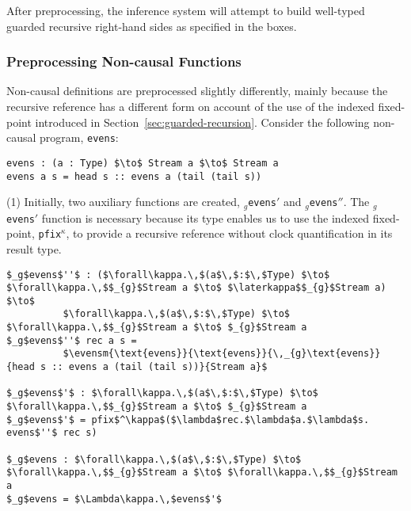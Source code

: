 After preprocessing, the inference system will attempt to build well-typed
guarded recursive right-hand sides as specified in the boxes.

\newcommand{\evens}[5]{\ensuremath{\boxed{#1;\noncausal;\phi,(#2,#3);\open;\Gamma\,\vdash\,\text{#4}\,:\,\text{#5}\,\infer
        \text{?}\,:\,\forall\kappa\,_{g}\text{#5})}}}
\newcommand{\evensm}[5]{\ensuremath{\boxed{
            \begin{matrix*}[l] #1;\causal;\phi,(#2,#3);\open;\Gamma\,\vdash \\
                           \quad\text{#4}\,:\,\text{#5}\,\infer\,\text{?}\,:\,\forall\kappa.\,_{g}\text{#5})
            \end{matrix*}
            }}}
\subsubsection{Preprocessing Non-causal Functions}
Non-causal definitions are preprocessed slightly differently, mainly because the
recursive reference has a different form on account of the use of the indexed
fixed-point introduced in Section~\ref{sec:guarded-recursion}. Consider the
following non-causal program, \texttt{evens}:
\begin{lstlisting}[mathescape]
evens : (a : Type) $\to$ Stream a $\to$ Stream a
evens a s = head s :: evens a (tail (tail s))
\end{lstlisting}
(1) Initially, two auxiliary functions are created, \texttt{$_{g}$evens$'$} and
\texttt{$_{g}$evens$''$}. The \texttt{$_{g}$evens$'$} function is necessary because its type
enables us to use the indexed fixed-point, \texttt{pfix$^\kappa$}, to provide a recursive reference
without clock quantification in its result type.
\begin{lstlisting}[mathescape]
$_g$evens$''$ : ($\forall\kappa.\,$(a$\,$:$\,$Type) $\to$ $\forall\kappa.\,$$_{g}$Stream a $\to$ $\laterkappa$$_{g}$Stream a) $\to$ 
          $\forall\kappa.\,$(a$\,$:$\,$Type) $\to$ $\forall\kappa.\,$$_{g}$Stream a $\to$ $_{g}$Stream a
$_g$evens$''$ rec a s = 
          $\evensm{\text{evens}}{\text{evens}}{\,_{g}\text{evens}}{head s :: evens a (tail (tail s))}{Stream a}$

$_g$evens$'$ : $\forall\kappa.\,$(a$\,$:$\,$Type) $\to$ $\forall\kappa.\,$$_{g}$Stream a $\to$ $_{g}$Stream a
$_g$evens$'$ = pfix$^\kappa$($\lambda$rec.$\lambda$a.$\lambda$s. evens$''$ rec s)

$_g$evens : $\forall\kappa.\,$(a$\,$:$\,$Type) $\to$ $\forall\kappa.\,$$_{g}$Stream a $\to$ $\forall\kappa.\,$$_{g}$Stream a
$_g$evens = $\Lambda\kappa.\,$evens$'$
\end{lstlisting}
